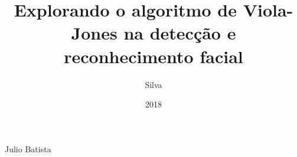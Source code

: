 \title{Explorando o algoritmo de Viola-Jones na detecção e reconhecimento facial}


\author{Silva}{Julio Batista}
\date{2018}
\maketitle
